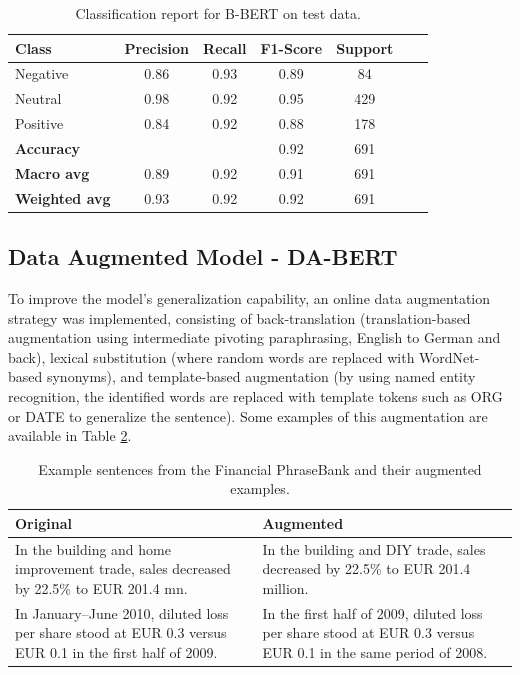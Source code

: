 \documentclass[conference]{IEEEtran}
\begin{document}
\begin{table}[H]
\centering
\caption{Classification report for B-BERT on test data.}
\label{cr_basebert_test}
\begin{tabular}{lcccccc}
\toprule
\textbf{Class} & \textbf{Precision} & \textbf{Recall} & \textbf{F1-Score} & \textbf{Support} \\
\midrule
Negative & 0.86 & 0.93 & 0.89 & 84 \\
Neutral & 0.98 & 0.92 & 0.95 & 429 \\
Positive & 0.84 & 0.92 & 0.88 & 178 \\
\midrule
\textbf{Accuracy} &  &  & 0.92 & 691 \\
\textbf{Macro avg} & 0.89 & 0.92 & 0.91 & 691 \\
\textbf{Weighted avg} & 0.93 & 0.92 & 0.92 & 691 \\
\bottomrule
\end{tabular}
\end{table}

\subsection{Data Augmented Model - DA-BERT}

To improve the model's generalization capability, an online data augmentation strategy was implemented, consisting of back-translation (translation-based augmentation using intermediate pivoting paraphrasing, English to German and back), lexical substitution (where random words are replaced with WordNet-based synonyms), and template-based augmentation (by using named entity recognition, the identified words are replaced with template tokens such as ORG or DATE to generalize the sentence). Some examples of this augmentation are available in Table \ref{tab:fpb_augm_examples}.

\begin{table}[ht]
\centering
\caption{Example sentences from the Financial PhraseBank and their augmented examples.}
\label{tab:fpb_augm_examples}
\begin{tabular}{p{3.5cm}p{3.5cm}}
\toprule
\textbf{Original} & \textbf{Augmented} \\
\midrule
In the building and home improvement trade, sales decreased by 22.5\% to EUR 201.4 mn. & In the building and DIY trade, sales decreased by 22.5\% to EUR 201.4 million. \\
In January–June 2010, diluted loss per share stood at EUR 0.3 versus EUR 0.1 in the first half of 2009. & In the first half of 2009, diluted loss per share stood at EUR 0.3 versus EUR 0.1 in the same period of 2008. \\
\bottomrule
\end{tabular}
\end{table}
\end{document}

